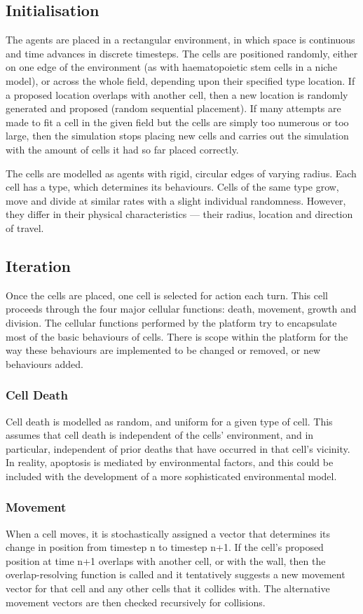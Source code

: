 \documentclass[12pt]{article}
\begin{document}
\subsection{Initialisation}
The agents are placed in a rectangular environment, in which space is 
continuous and time advances in discrete timesteps. The cells are 
positioned randomly, either on one edge of the environment (as with 
haematopoietic stem cells in a niche model), or across the whole field, 
depending upon their specified type location. If a proposed location 
overlaps with another cell, then a new location is randomly generated 
and proposed (random sequential placement). If many attempts are made to 
fit a cell in the given field but the cells are simply too numerous or
too large, then the simulation stops placing new cells and carries out 
the simulation with the amount of cells it had so far placed correctly.

The cells are modelled as agents with rigid, circular edges of varying 
radius. Each cell has a type, which determines its behaviours. Cells of 
the same type grow, move and divide at similar rates with a slight 
individual randomness. However, they differ in their physical 
characteristics --- their radius, location and direction of travel.

\subsection{Iteration}
Once the cells are placed, one cell is selected for action each turn. 
This cell proceeds through the four major cellular functions: death, 
movement, growth and division. The cellular functions performed by the 
platform try to encapsulate most of the basic behaviours of cells. There 
is scope within the platform for the way these behaviours are 
implemented to be changed or removed, or new behaviours added.

\subsubsection{Cell Death}
Cell death is modelled as random, and uniform for a given type of cell. 
This assumes that cell death is independent of the cells' environment, 
and in particular, independent of prior deaths that have occurred in 
that cell's vicinity. In reality, apoptosis is mediated by environmental 
factors, and this could be included with the development of a more 
sophisticated environmental model.

\subsubsection{Movement}
When a cell moves, it is stochastically assigned a vector that 
determines its change in position from timestep n to timestep n+1. If 
the cell's proposed position at time n+1 overlaps with another cell, or 
with the wall, then the overlap-resolving function is called and it 
tentatively suggests a new movement vector for that cell and any other 
cells that it collides with. The alternative movement vectors are then 
checked recursively for collisions.
\end{document}
